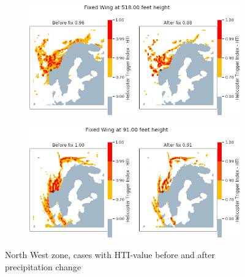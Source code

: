 \begin{figure}[H]
    \begin{subfigure}{0.45\textwidth}
    \centering
    \includegraphics[width=\textwidth]{Figures/22.png}
    \caption{}
    \label{fig:HTI22}
    \end{subfigure}
\hfill
    \begin{subfigure}{0.45\textwidth}
    \centering
    \includegraphics[width=\textwidth]{Figures/34.png}
    \caption{}
    \label{fig:HTI34}
    \end{subfigure}
\caption{North West zone, cases with HTI-value before and after precipitation change}
\end{figure}



